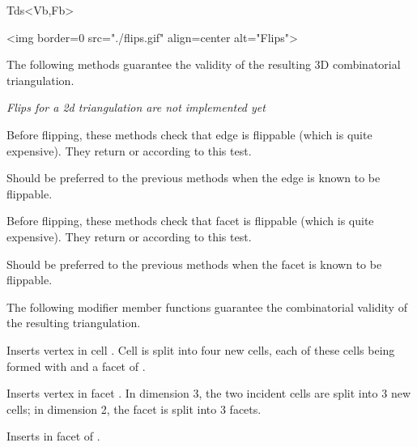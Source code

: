 \begin{ccClassTemplate}{Tds<Vb,Fb>}
\begin{ccHtmlOnly}
<img border=0 src="./flips.gif" align=center
alt="Flips">
\end{ccHtmlOnly}

The following methods guarantee the validity of the resulting 3D
combinatorial triangulation.

\textit{Flips for a 2d triangulation are not implemented yet}

\ccGlue
{}
{Before flipping, these methods check that edge  is
flippable (which is quite expensive). They return  or
 according to this test.}

\ccGlue
{}
{Should be preferred to the previous methods when the edge is
known to be flippable.
}

\ccGlue
{}
{Before flipping, these methods check that facet  is
flippable (which is quite expensive). They return  or
 according to this test.} 

\ccGlue
{}
{Should be preferred to the previous methods when the facet is
known to be flippable.
}


The following modifier member functions guarantee
the combinatorial validity of the resulting triangulation.

{Inserts vertex  in cell . Cell  is split into four
new cells, each of these cells being formed with  and a facet
of .
}

{Inserts vertex  in facet . In dimension 3, the two
incident cells are split into 3 new cells; in dimension 2, the facet is
split into 3 facets.
} 

{Inserts  in facet  of .
} 


\end{ccClassTemplate}
